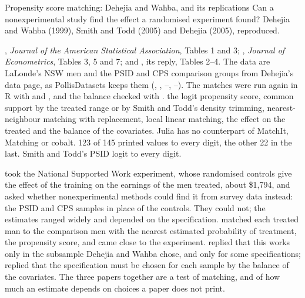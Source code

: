 



  {Propensity score matching: Dehejia and Wahba, and its replications}
  {Can a nonexperimental study find the effect a randomised experiment found? Dehejia and Wahba (1999), Smith and Todd (2005) and Dehejia (2005), reproduced.}

\factsheet
  {, \emph{Journal of the American Statistical Association}, Tables 1 and 3;
   , \emph{Journal of Econometrics}, Tables 3, 5 and 7; and
   , its reply, Tables 2--4. The data are LaLonde's NSW men and the PSID and CPS comparison
   groups from Dehejia's data page, as PollisDatasets keeps them (, , --,
   --). The matches were run again in R with
    and , and the balance checked with .}
  {the logit propensity score, common support by the treated range or by Smith and Todd's density trimming,
   nearest-neighbour matching with replacement, local linear matching, the effect on the treated and the balance of the
   covariates. Julia has no counterpart of MatchIt, Matching or cobalt.}
  {}
  {123 of 145 printed values to every digit, the other 22 in the last. Smith and Todd's PSID logit to every digit.}

 took the National Supported Work experiment, whose randomised controls give the
effect of the training on the earnings of the men treated, about \$1,794, and asked whether nonexperimental methods could
find it from survey data instead: the PSID and CPS samples in place of the controls. They could not; the estimates ranged
widely and depended on the specification.  matched each treated man to the
comparison men with the nearest estimated probability of treatment, the propensity score, and came close to the
experiment.  replied that this works only in the subsample Dehejia and Wahba chose,
and only for some specifications;  replied that the specification must be chosen for each
sample by the balance of the covariates. The three papers together are a test of matching, and of how much an estimate
depends on choices a paper does not print.

